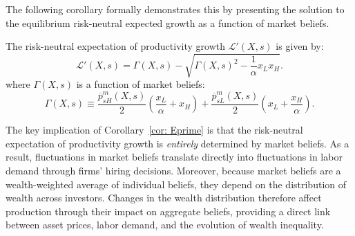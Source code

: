 The following corollary formally demonstrates this by presenting the solution to the equilibrium risk-neutral expected growth as a function of market beliefs.
\begin{corollary}\label{cor: Eprime} The risk-neutral expectation of productivity growth $\mathcal{L}'(X,s)$ is given by: 
\begin{equation}
    \mathcal{L}'(X,s)=\Gamma(X,s) - \sqrt{\Gamma(X,s)^{2}-\frac{1}{\alpha}  x_L x_H}.\nonumber
\end{equation}
where $\Gamma(X,s)$ is a function of market beliefs:
\[  
\Gamma(X,s)\equiv  \frac{\overline{p}^m_{sH}(X,s)}{2} \left(\frac{x_L}{\alpha} + x_H \right)+ \frac{\overline{p}^m_{sL}(X,s)}{2}\left(  x_L + \frac{x_H}{\alpha} \right).
\]
\end{corollary}
The key implication of Corollary~\ref{cor: Eprime} is that the risk-neutral expectation of productivity growth is \emph{entirely} determined by market beliefs. 
As a result, fluctuations in market beliefs translate directly into fluctuations in labor demand through firms' hiring decisions. 
Moreover, because market beliefs are a wealth-weighted average of individual beliefs, they depend on the distribution of wealth across investors. 
Changes in the wealth distribution therefore affect production through their impact on aggregate beliefs, providing a direct link between asset prices, labor demand, and the evolution of wealth inequality.


